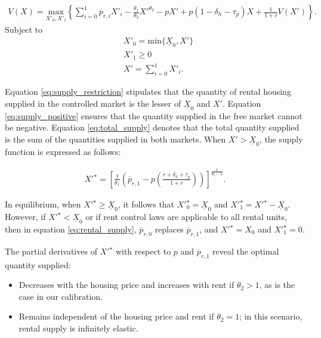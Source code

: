 \documentclass[parskip=full]{article}
\begin{document}
\begin{align}\label{eq:rental_company_problem}
V(X)=\underset{X'_{0},X'_{1}} {\text{$\mbox{max} $}}\left\{\sum_{i=0}^{1} \overline{p}_{r,i}X'_{i}-\frac{\theta_{1}}{\theta_{2}}X'^{\theta_{2}}-p X'+p(1-\delta_{h}-\tau_{p})X+\frac{1}{1+r}V(X')\right\}.
\end{align}
Subject to
\begin{align}
& X'_{0}=\mbox{min}\{\underline{X}_{0},X'\} \label{eq:supply_restriction} \\
& X'_{1} \geq 0 \label{eq:supply_positive} \\
& X'=\sum^{1}_{i=0} X'_{i}. \label{eq:total_supply} 
\end{align}

\noindent Equation \eqref{eq:supply_restriction} stipulates that the quantity of rental housing supplied in the controlled market is the lesser of $\underline{X}_{0}$ and $X'$. Equation \eqref{eq:supply_positive} ensures that the quantity supplied in the free market cannot be negative. Equation \eqref{eq:total_supply} denotes that the total quantity supplied is the sum of the quantities supplied in both markets. When $X'>\underline{X}_{0}$, the supply function is expressed as follows:

\begin{align}\label{eq:rental_supply}
X'^{\star}=\left[\frac{1}{\theta_{1}}\left(\overline{p}_{r,1}-p\left(\frac{r+\delta_{h}+\tau_{p}}{1+r}\right)\right)\right]^{\frac{1}{\theta_{2}-1}}.
\end{align}

\noindent In equilibrium, when $X'^{\star} \geq \underline{X}_{0}$, it follows that $X'^{\star}_{0}=\underline{X}_{0}$ and $X'^{\star}_{1}=X'^{\star}-\underline{X}_{0}$. However, if $X'^{\star} < \underline{X}_{0}$ or if rent control laws are applicable to all rental units, then in equation \eqref{eq:rental_supply}, $\overline{p}_{r,0}$ replaces $\overline{p}_{r,1}$, and $X'^{\star}=X_{0}$ and $X'^{\star}_{1}=0$.

\noindent The partial derivatives of $X'^{\star}$ with respect to $p$ and $\overline{p}_{r,1}$ reveal the optimal quantity supplied:

\begin{itemize}
    \item Decreases with the housing price and increases with rent if $\theta_{2} > 1$, as is the case in our calibration.
    \item Remains independent of the housing price and rent if $\theta_{2} = 1$; in this scenario, rental supply is infinitely elastic.
\end{itemize}
\end{document}
